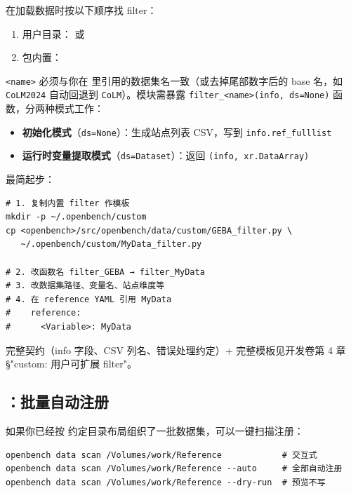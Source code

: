 \openbench{} 在加载数据时按以下顺序找 filter：

\begin{enumerate}
  \item 用户目录： 或 
  \item 包内置：
\end{enumerate}

\texttt{<name>} 必须与你在  里引用的数据集名一致（或去掉尾部数字后的 base 名，如 \texttt{CoLM2024} 自动回退到 \texttt{CoLM}）。模块需暴露 \texttt{filter\_<name>(info, ds=None)} 函数，分两种模式工作：

\begin{itemize}
  \item \textbf{初始化模式}（\texttt{ds=None}）：生成站点列表 CSV，写到 \texttt{info.ref\_fulllist}
  \item \textbf{运行时变量提取模式}（\texttt{ds=Dataset}）：返回 \texttt{(info, xr.DataArray)}
\end{itemize}

最简起步：

\begin{verbatim}
# 1. 复制内置 filter 作模板
mkdir -p ~/.openbench/custom
cp <openbench>/src/openbench/data/custom/GEBA_filter.py \
   ~/.openbench/custom/MyData_filter.py

# 2. 改函数名 filter_GEBA → filter_MyData
# 3. 改数据集路径、变量名、站点维度等
# 4. 在 reference YAML 引用 MyData
#    reference:
#      <Variable>: MyData
\end{verbatim}

完整契约（info 字段、CSV 列名、错误处理约定）+ 完整模板见开发卷第 4 章 §"custom: 用户可扩展 filter"。


\subsection{：批量自动注册}

如果你已经按 \openbench{} 约定目录布局组织了一批数据集，可以一键扫描注册：

\begin{verbatim}
openbench data scan /Volumes/work/Reference            # 交互式
openbench data scan /Volumes/work/Reference --auto     # 全部自动注册
openbench data scan /Volumes/work/Reference --dry-run  # 预览不写
\end{verbatim}

